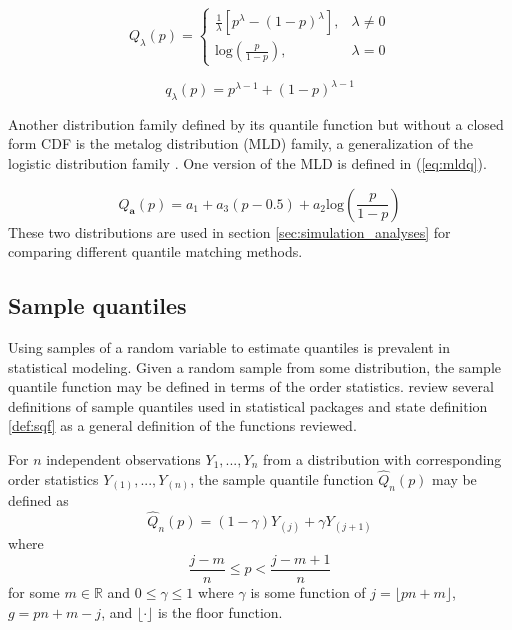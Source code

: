 \begin{equation}
    \label{eq:tuk_lam}
    Q_{\lambda}(p) = \begin{cases} 
      \frac{1}{\lambda} \left[p^{\lambda} - (1 - p)^{\lambda} \right], & \lambda \neq 0 \\
      \text{log} \left(\frac{p}{1 - p} \right), & \lambda = 0
   \end{cases}
\end{equation}

\begin{equation}
    \label{eq:tuk_lam_qd}
    q_{\lambda}(p) = p^{\lambda - 1} + (1-p)^{\lambda -1} 
\end{equation}

Another distribution family defined by its quantile function but without a 
closed form CDF is the metalog distribution (MLD) family, a generalization of 
the logistic distribution family \cite[]{keelin2016metalog}. One version of the 
MLD is defined in (\ref{eq:mldq}).

\begin{equation}
    \label{eq:mldq}
    Q_{\textbf{a}}(p) = a_1 + a_3(p - 0.5) + a_2\text{log}\left(\frac{p}{1-p} \right)
\end{equation}
These two distributions are used in section \ref{sec:simulation_analyses} 
for comparing different quantile matching methods.


















\subsection{Sample quantiles} \label{sec:samp_quants}

Using samples of a random variable to estimate quantiles is prevalent in 
statistical modeling. Given a random sample from some distribution, the sample 
quantile function may be defined in terms of the order statistics. 
\cite{hyndman1996sample} review several definitions of sample quantiles used in 
statistical packages and state definition \ref{def:sqf} as a general definition 
of the functions reviewed. 

\begin{definition}
For $n$ independent observations $Y_1, ..., Y_n$ from a distribution with 
corresponding order statistics $Y_{(1)}, ..., Y_{(n)}$, the sample quantile 
function $\hat{Q}_n(p)$ may be defined as
    \label{def:sqf}
    \begin{equation}
        \label{eq:quant_df}
        \hat{Q}_n(p) = (1- \gamma)Y_{(j)} + \gamma Y_{(j + 1)}
    \end{equation}
    where 
    \[\frac{j - m}{n} \leq p < \frac{j - m + 1}{n}
    \]
    for some $m \in \mathbb{R}$ and $0 \leq \gamma \leq 1$ where 
    $\gamma$ is some function of $j = \lfloor pn + m \rfloor$,  
    $g = pn + m - j$, and $\lfloor \cdot \rfloor$ is the floor function.
\end{definition}

